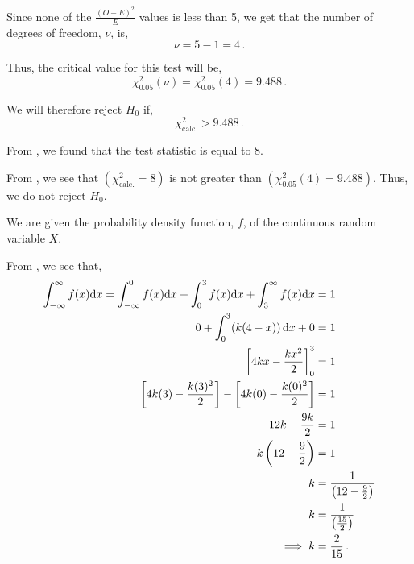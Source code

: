 \begin{subquestions}
\begin{subsubquestions}
Since none of the $\frac{(O-E)^2}{E}$ values is less than 5, we get that the number of degrees of freedom, $\nu$, is,
\begin{equation}
	\nu = 5-1=4 \,.
\end{equation}

Thus, the critical value for this test will be,
\begin{equation}
	\chi^{2}_{0.05} (\nu) = \chi^{2}_{0.05} (4) = 9.488 \,.
\end{equation}

We will therefore reject $H_0$ if,
\begin{equation}
	\chi^{2}_{\text{calc.}} > 9.488 \,. \label{2016:q4:CritReg}
\end{equation}


\subsubquestion

From , we found that the test statistic is equal to 8.


\subsubquestion

From , we see that $\left( \chi^{2}_{\text{calc.}}=8 \right)$ is not greater than $\left(\chi^{2}_{0.05} (4) = 9.488 \right)$. Thus, we do not reject $H_0$.

\end{subsubquestions}
	
	
\subquestion

We are given the probability density function, $f$, of the continuous random variable $X$.

\begin{subsubquestions}
	
\subsubquestion

From , we see that,
\begin{align}
	\int_{-\infty}^{\infty} f(x)\mathrm{d}x = \int_{-\infty}^{0} f(x)\mathrm{d}x + \int_{0}^{3} f(x)\mathrm{d}x + \int_{3}^{\infty} f(x)\mathrm{d}x & = 1 \nonumber \\
	0+ \int_{0}^{3} (k(4-x))\, \mathrm{d}x +0 & = 1 \nonumber \\
	\left[ 4kx- \frac{kx^2}{2} \right]^3_0 & = 1 \nonumber \\
	\left[ 4k(3)- \frac{k(3)^2}{2} \right] - \left[ 4k(0)- \frac{k(0)^2}{2} \right] & = 1 \nonumber \\
	12k - \frac{9k}{2} & = 1 \nonumber \\
	k \left(12 - \frac{9}{2}\right) & = 1 \nonumber \\
	k & = \frac{1}{\left(12 - \frac{9}{2}\right)} \nonumber \\
	k & = \frac{1}{\left(\frac{15}{2}\right)} \nonumber \\
	\implies k & = \frac{2}{15} \,.
\end{align}
	

\end{subsubquestions}
\end{subquestions}
